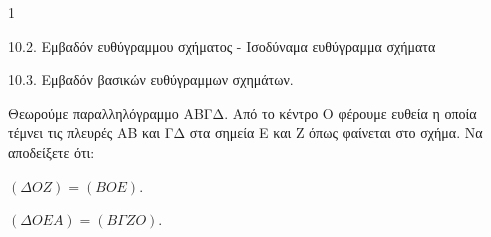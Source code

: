 \begin{ylh}{1}
    \item 10.2. Εμβαδόν ευθύγραμμου σχήματος - Ισοδύναμα ευθύγραμμα σχήματα
    \item 10.3. Εμβαδόν βασικών ευθύγραμμων σχημάτων.
\end{ylh}
\begin{figure} %
\centering
{}
\end{figure}
Θεωρούμε παραλληλόγραμμο ΑΒΓΔ. Από το κέντρο Ο φέρουμε ευθεία η οποία τέμνει τις πλευρές ΑΒ και ΓΔ στα σημεία Ε και Ζ όπως φαίνεται στο σχήμα. Να αποδείξετε ότι:
\begin{alist}
    \item $(\Delta OZ) = (BOE)$. 
    \item $(\Delta OEA) = (B\Gamma ZO)$. 
\end{alist}